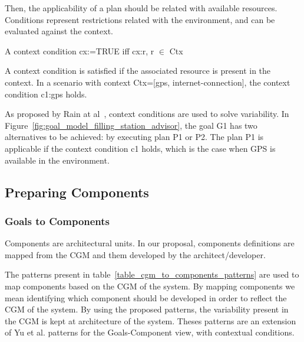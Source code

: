 Then, the applicability of a plan should be related with available resources. Conditions represent restrictions related with the environment, and can be evaluated against the context.

\begin{defn}
  A context condition cx:=TRUE iff cx:r, r $\in$ Ctx
\end{defn}

A context condition is satisfied if the associated resource is present in the context.
In a scenario with context Ctx=[gps, internet-connection], the context condition c1:gps holds.

As proposed by Rain at al~\cite{ali_goal-based_2010}, context conditions are used to solve variability. In Figure~\ref{fig:goal_model_filling_station_advisor}, the goal G1 has two alternatives to be achieved: by executing plan P1 or P2. The plan P1 is applicable if the context condition c1 holds, which is the case when GPS is available in the environment.


\subsection{Preparing Components}

\subsubsection{Goals to Components}
\label{sec:goals_components}
Components are architectural units. In our proposal, components definitions are mapped from the CGM and them developed by the architect/developer.

The patterns present in table~\ref{table_cgm_to_components_patterns} are used to map components based on the CGM of the system. By mapping components we mean identifying which component should be developed in order to reflect the CGM of the system. By using the proposed patterns, the variability present in the CGM is kept at architecture of the system. Theses patterns are an extension of Yu et al.\cite{yu_goals_2008} patterns for the Goals-Component view, with contextual conditions.


